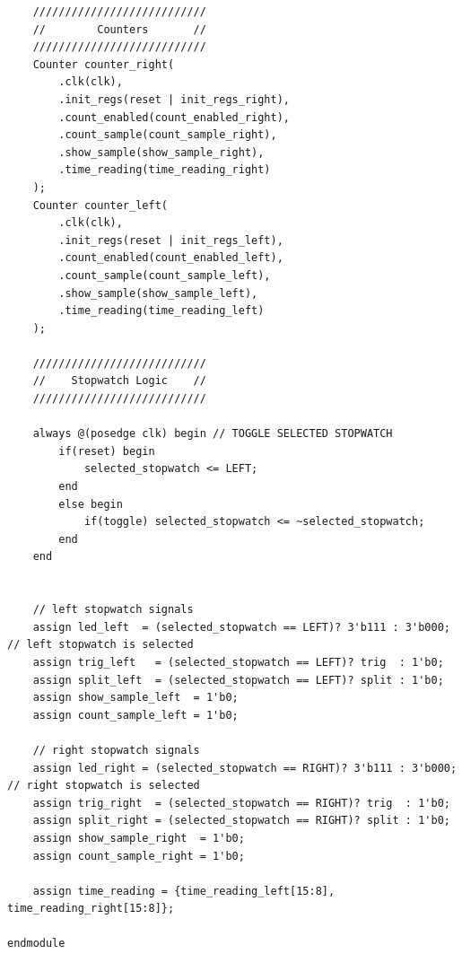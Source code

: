 \documentclass[11pt,a4paper]{article}
\begin{document}
\begin{lstlisting}
    ///////////////////////////
    //        Counters       //
    ///////////////////////////
    Counter counter_right(
        .clk(clk),
        .init_regs(reset | init_regs_right),
        .count_enabled(count_enabled_right),
        .count_sample(count_sample_right),
        .show_sample(show_sample_right),
        .time_reading(time_reading_right)
    );
    Counter counter_left(
        .clk(clk),
        .init_regs(reset | init_regs_left),
        .count_enabled(count_enabled_left),
        .count_sample(count_sample_left),
        .show_sample(show_sample_left),
        .time_reading(time_reading_left)
    );

    ///////////////////////////
    //    Stopwatch Logic    //
    ///////////////////////////

    always @(posedge clk) begin // TOGGLE SELECTED STOPWATCH
        if(reset) begin
            selected_stopwatch <= LEFT;
        end
        else begin
            if(toggle) selected_stopwatch <= ~selected_stopwatch;
        end
    end


    // left stopwatch signals
	assign led_left  = (selected_stopwatch == LEFT)? 3'b111 : 3'b000; // left stopwatch is selected
    assign trig_left   = (selected_stopwatch == LEFT)? trig  : 1'b0;
    assign split_left  = (selected_stopwatch == LEFT)? split : 1'b0;
    assign show_sample_left  = 1'b0;
    assign count_sample_left = 1'b0;

    // right stopwatch signals
    assign led_right = (selected_stopwatch == RIGHT)? 3'b111 : 3'b000; // right stopwatch is selected
    assign trig_right  = (selected_stopwatch == RIGHT)? trig  : 1'b0;
    assign split_right = (selected_stopwatch == RIGHT)? split : 1'b0;
    assign show_sample_right  = 1'b0;
    assign count_sample_right = 1'b0;

    assign time_reading = {time_reading_left[15:8], time_reading_right[15:8]};

endmodule
\end{lstlisting}
\end{document}
